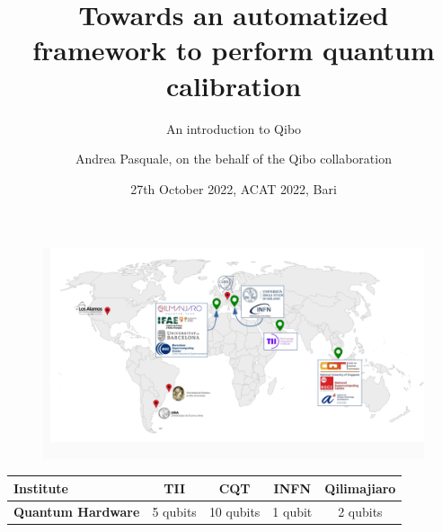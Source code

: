 \documentclass[11p,aspectratio=169]{beamer}
\title{ Towards an automatized framework to perform quantum calibration}
\subtitle{An introduction to Qibo}
\author{Andrea Pasquale, on the behalf of the Qibo collaboration}
\date{27th October 2022, ACAT 2022, Bari}
\begin{document}
\maketitle


\begin{frame}
    \begin{figure}
        \includegraphics[width=\textwidth]{figures/map.png}
    \end{figure}
        \begin{table}
            \centering
            \begin{tabular}{lcccc}
                \toprule
                \textbf{Institute} & TII & CQT & INFN & Qilimajiaro\\
                \midrule
                \textbf{Quantum Hardware} & 5 qubits & 10 qubits & 1 qubit & 2 qubits \\
                \bottomrule
            \end{tabular}
            \label{tab:qibo_versions}
            \end{table}
\end{frame}
\end{document}
